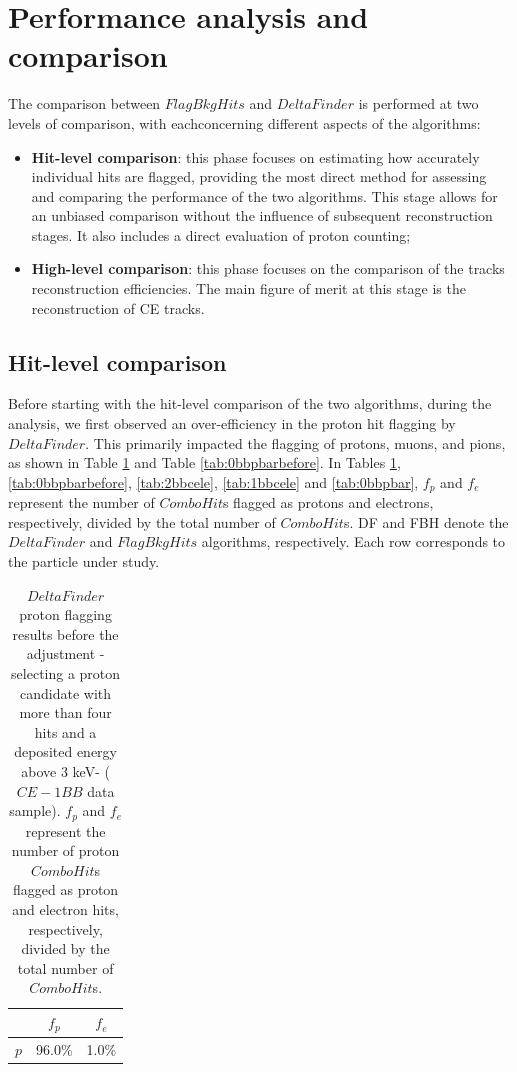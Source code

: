 \section{Performance analysis and comparison}
The comparison between $FlagBkgHits$ and $DeltaFinder$ 
is performed at two levels of 
comparison, with eachconcerning different aspects 
  of the algorithms: 
\begin{itemize}
    \item \textbf{Hit-level comparison}: this 
    phase focuses 
    on estimating how accurately individual hits are 
    flagged, providing the most direct method for 
    assessing and comparing the performance of the two 
    algorithms. This stage allows for an unbiased 
    comparison without the influence of subsequent 
    reconstruction stages. It also includes a 
    direct evaluation of proton counting;
    
    \item \textbf{High-level comparison}: this phase focuses on the 
    comparison of the tracks reconstruction efficiencies. The main figure 
    of merit at this stage is the 
    reconstruction of CE tracks.

\end{itemize}

\subsection{Hit-level comparison}
Before starting with the hit-level 
comparison of the two algorithms, during the analysis, 
we first observed an over-efficiency 
in the proton hit flagging by $DeltaFinder$. 
This primarily impacted the flagging of 
protons, muons, and pions, as shown in 
Table \ref{tab:1bbcelebefore} and Table 
\ref{tab:0bbpbarbefore}. In Tables 
\ref{tab:1bbcelebefore}, \ref{tab:0bbpbarbefore}, 
\ref{tab:2bbcele}, \ref{tab:1bbcele} and 
\ref{tab:0bbpbar}, $f_p$ and 
$f_e$ represent 
the number of $ComboHit$s flagged as 
protons and electrons, respectively, 
divided by the total number of 
$ComboHit$s. DF and FBH denote the $DeltaFinder$ 
and $FlagBkgHits$ algorithms, 
respectively. Each row corresponds to the particle 
under study.

\begin{center}
    \begin{table}[h!]
    \centering
    \renewcommand{\arraystretch}{1.}
    \begin{tabular}{| c | c | c |} 
    \hline
    & $f_{p}$ & $f_{e}$ \\
    \hline
    $p$     & 96.0\% & 1.0\% \\
    \hline
    \end{tabular}
    \caption{$DeltaFinder$ proton 
    flagging results before the 
    adjustment -selecting a proton 
    candidate with more than four hits 
    and a deposited energy above 3 keV- ($CE-1BB$ data sample). 
    $f_p$ and $f_e$ represent 
    the number of proton $ComboHit$s 
    flagged as proton and electron hits, respectively, 
    divided by the total number of $ComboHit$s.}
    \label{tab:1bbcelebefore}
    \end{table}
\end{center}
    
